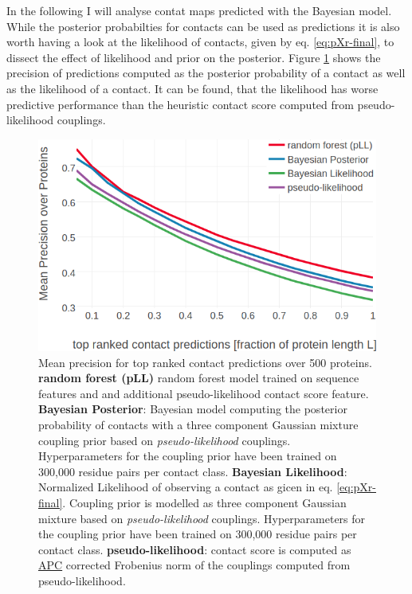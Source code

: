 \documentclass[11pt,a4paper,twoside]{book}
\theoremstyle{definition}
\theoremstyle{definition}
\theoremstyle{remark}
\begin{document}
In the following I will analyse contat maps predicted with the Bayesian
model. While the posterior probabilties for contacts can be used as
predictions it is also worth having a look at the likelihood of
contacts, given by eq. \eqref{eq:pXr-final}, to dissect the effect of
likelihood and prior on the posterior. Figure
\ref{fig:precision-bayesian-model-pll-3comp-300k-lik} shows the
precision of predictions computed as the posterior probability of a
contact as well as the likelihood of a contact. It can be found, that
the likelihood has worse predictive performance than the heuristic
contact score computed from pseudo-likelihood couplings.

















\begin{figure}

{\centering \includegraphics[width=0.9\linewidth]{img/bayesian_model/benchmark/precision_vs_rank_pll_3comp_300k_likelihood} 

}

\caption{Mean precision
for top ranked contact predictions over 500 proteins. \textbf{random
forest (pLL)} random forest model trained on sequence features and and
additional pseudo-likelihood contact score feature. \textbf{Bayesian
Posterior}: Bayesian model computing the posterior probability of
contacts with a three component Gaussian mixture coupling prior based on
\emph{pseudo-likelihood} couplings. Hyperparameters for the coupling
prior have been trained on 300,000 residue pairs per contact class.
\textbf{Bayesian Likelihood}: Normalized Likelihood of observing a
contact as gicen in eq. \eqref{eq:pXr-final}. Coupling prior is modelled
as three component Gaussian mixture based on \emph{pseudo-likelihood}
couplings. Hyperparameters for the coupling prior have been trained on
300,000 residue pairs per contact class. \textbf{pseudo-likelihood}:
contact score is computed as \protect\hyperlink{abbrev}{APC} corrected
Frobenius norm of the couplings computed from pseudo-likelihood.}\label{fig:precision-bayesian-model-pll-3comp-300k-lik}
\end{figure}
\end{document}
